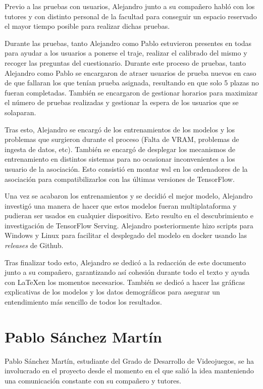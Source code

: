 Previo a las pruebas con usuarios, Alejandro junto a su compañero habló con los tutores y con distinto personal de la facultad para conseguir un espacio reservado el mayor tiempo posible para realizar dichas pruebas.

Durante las pruebas, tanto Alejandro como Pablo estuvieron presentes en todas para ayudar a los usuarios a ponerse el traje, realizar el calibrado del mismo y recoger las preguntas del cuestionario. Durante este proceso de pruebas, tanto Alejandro como Pablo se encargaron de atraer usuarios de prueba nuevos en caso de que fallaran los que tenían prueba asignada, resultando en que solo 5 plazas no fueran completadas.
También se encargaron de gestionar horarios para maximizar el número de pruebas realizadas y gestionar la espera de los usuarios que se solaparan.

Tras esto, Alejandro se encargó de los entrenamientos de los modelos y los problemas que surgieron durante el proceso (Falta de VRAM, problemas de ingesta de datos, etc). También se encargó de desplegar los mecanismos de entrenamiento en distintos sistemas para no ocasionar inconvenientes a los usuario de la asociación. Esto consistió en montar \gls{wsl} en los ordenadores de la asociación para compatibilizarlos con las últimas versiones de TensorFlow.

Una vez se acabaron los entrenamientos y se decidió el mejor modelo, Alejandro investigó una manera de hacer que estos modelos fueran multiplataforma y pudieran ser usados en cualquier dispositivo. Esto resulto en el descubrimiento e investigación de TensorFlow Serving. Alejandro posteriormente hizo scripts para Windows y Linux para facilitar el desplegado del modelo en docker usando las \textit{releases} de Github.

Tras finalizar todo esto, Alejandro se dedicó a la redacción de este documento junto a su compañero, garantizando así cohesión durante todo el texto y ayuda con \LaTeX en los momentos necesarios. También se dedicó a hacer las gráficas explicativas de los modelos y los datos demográficos para asegurar un entendimiento más sencillo de todos los resultados.

\section*{Pablo Sánchez Martín}
Pablo Sánchez Martín, estudiante del Grado de Desarrollo de Videojuegos, se ha involucrado en el proyecto desde el momento en el que salió la idea manteniendo una comunicación constante con su compañero y tutores.

